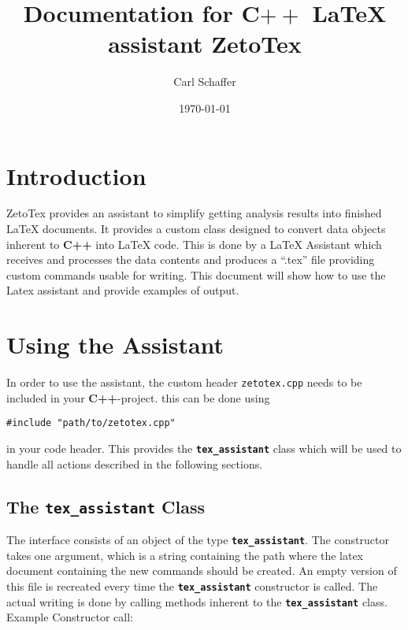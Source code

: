 \documentclass[10pt,a4paper]{article}
\title{Documentation for C${++}$ \LaTeX{} assistant ZetoTex}
\date{\today{}}
\author{Carl Schaffer}
\begin{document}
      \maketitle
      \newpage{}

      \setlength{\parindent}{0pt}

      \newcommand{\stdv}{\texttt{std::vector} } 
      \newcommand{\la}{LaTeX Assistant}
      \newcommand{\ta}{\texttt{\textbf{tex\_assistant}}}
      \newcommand{\filename}[1]{\texttt{#1}}
      \newcommand{\cpp}{\textbf{C++}}
      \newcommand{\ztt}{ZetoTex}

      \newcommand{\singleValCmd}{\cmdstyle{.ncmdValue()}}
      \newcommand{\arrayCmd}{\cmdstyle{.ncmdArray()}}
      \newcommand{\cmdstyle}[1]{\textbf{\texttt{#1}}}

      \newcommand{\headerfile}{\filename{zetotex.cpp}}
      \newcommand{\texfile}{\enquote{.tex} file}


\section{Introduction}
 \ztt{} provides an assistant to simplify
getting analysis results into finished \LaTeX{} documents. It
provides a custom class designed to convert data objects inherent to \cpp{} into
\LaTeX{} code. This is done by a \la{} which receives and processes the data
contents and produces a \enquote{.tex} file providing custom commands usable for
writing. This document will show how to use the Latex assistant and provide
examples of output.


\section{Using the Assistant}
In order to use the assistant, the custom header \headerfile{} needs to be
included in your \cpp{}-project. this can be done using
\begin{verbatim}
#include "path/to/zetotex.cpp"
\end{verbatim}
in your code header. This provides the \ta{} class which will be used to handle
all actions described in the following sections.
\subsection{The \ta{} Class}

The interface consists of an object of the type \ta{}. The constructor takes one
argument, which is a string containing the path where the latex document
containing the new commands should be created. An empty version of this file is
recreated every time the \ta{} constructor is called. The actual writing is done
by calling methods inherent to the \ta{} class. Example Constructor call:
\end{document}
